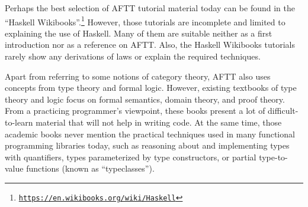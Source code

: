Perhaps the best selection of AFTT tutorial material today can be
found in the \textsf{``}Haskell Wikibooks\textsf{''}.\footnote{\texttt{\href{https://en.wikibooks.org/wiki/Haskell}{https://en.wikibooks.org/wiki/Haskell}}}
However, those tutorials are incomplete and limited to explaining
the use of Haskell. Many of them are suitable neither as a first introduction
nor as a reference on AFTT. Also, the Haskell Wikibooks tutorials
rarely show any derivations of laws or explain the required techniques.

Apart from referring to some notions of category theory, AFTT also
uses concepts from type theory and formal logic. However, existing
textbooks of type theory and logic focus on formal semantics, domain
theory, and proof theory. From a practicing programmer\textsf{'}s viewpoint,
these books present a lot of difficult-to-learn material that will
not help in writing code. At the same time, those academic books never
mention the practical techniques used in many functional programming
libraries today, such as reasoning about and implementing types with
quantifiers, types parameterized by type constructors, or partial
type-to-value functions (known as \textsf{``}typeclasses\textsf{''}).

